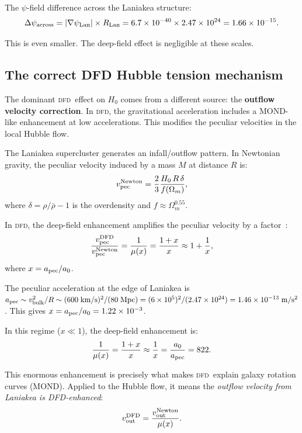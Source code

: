 \documentclass[aps,prd,twocolumn,superscriptaddress,nofootinbib,longbibliography]{revtex4-2}
\newcommand{\DFD}{\textsc{dfd}}
\begin{document}
The $\psi$-field difference across the Laniakea structure:
\begin{equation}
\Delta\psi_{\rm across} = |\nabla\psi_{\rm Lan}|\times R_{\rm Lan}
= 6.7\times10^{-40}\times 2.47\times10^{24} = 1.66\times10^{-15}.
\end{equation}

This is even smaller. The deep-field effect is negligible at these scales.

\subsection{The correct DFD Hubble tension mechanism}\label{sec:correct-mechanism}

The dominant \DFD\ effect on $H_0$ comes from a different source: the
\textbf{outflow velocity correction}. In \DFD, the gravitational
acceleration includes a MOND-like enhancement at low accelerations.
This modifies the peculiar velocities in the local Hubble flow.

The Laniakea supercluster generates an infall/outflow pattern. In
Newtonian gravity, the peculiar velocity induced by a mass $M$ at
distance $R$ is:
\begin{equation}
v_{\rm pec}^{\rm Newton} = \frac{2}{3}\frac{H_0\,R\,\delta}{f(\Omega_m)},
\end{equation}
where $\delta = \rho/\bar{\rho} - 1$ is the overdensity and
$f \approx \Omega_m^{0.55}$.

In \DFD, the deep-field enhancement amplifies the peculiar velocity by
a factor~\cite{DFD-formalism}:
\begin{equation}
\frac{v_{\rm pec}^{\rm DFD}}{v_{\rm pec}^{\rm Newton}} = \frac{1}{\mu(x)}
= \frac{1+x}{x} \approx 1 + \frac{1}{x},
\end{equation}
where $x = a_{\rm pec}/a_0$.

The peculiar acceleration at the edge of Laniakea is
$a_{\rm pec} \sim v_{\rm bulk}^2/R \sim (600\;\si{km/s})^2/(80\;\si{Mpc})
= (6\times10^5)^2/(2.47\times10^{24}) = 1.46\times10^{-13}\;\si{m/s^2}$.
This gives $x = a_{\rm pec}/a_0 = 1.22\times10^{-3}$.

In this regime ($x \ll 1$), the deep-field enhancement is:
\begin{equation}
\frac{1}{\mu(x)} = \frac{1+x}{x} \approx \frac{1}{x} = \frac{a_0}{a_{\rm pec}} = 822.
\end{equation}

This enormous enhancement is precisely what makes \DFD\ explain galaxy
rotation curves (MOND). Applied to the Hubble flow, it means the
\emph{outflow velocity from Laniakea is DFD-enhanced}:
\begin{equation}
v_{\rm out}^{\rm DFD} = \frac{v_{\rm out}^{\rm Newton}}{\mu(x)}.
\end{equation}
\end{document}
